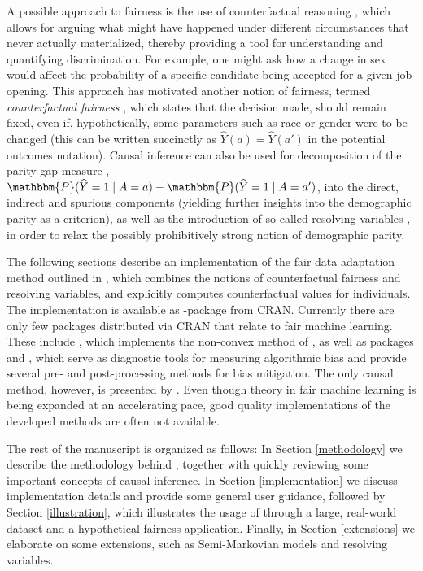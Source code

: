 \documentclass[
  nojss]{jss}
\begin{document}
A possible approach to fairness is the use of counterfactual reasoning
\citep{galles1998axiomatic}, which allows for arguing what might have
happened under different circumstances that never actually materialized,
thereby providing a tool for understanding and quantifying
discrimination. For example, one might ask how a change in sex would
affect the probability of a specific candidate being accepted for a
given job opening. This approach has motivated another notion of
fairness, termed \emph{counterfactual fairness}
\citep{kusner2017counterfactual}, which states that the decision made,
should remain fixed, even if, hypothetically, some parameters such as
race or gender were to be changed (this can be written succinctly as
\(\widehat{Y}(a) = \widehat{Y}(a')\) in the potential outcomes
notation). Causal inference can also be used for decomposition of the
parity gap measure \citep{zhang2018fairness},
\(\mathbbm{P}(\widehat{Y} = 1 \mid A = a) - \mathbbm{P}(\widehat{Y} = 1 \mid A = a')\),
into the direct, indirect and spurious components (yielding further
insights into the demographic parity as a criterion), as well as the
introduction of so-called resolving variables
\cite{kilbertus2017avoiding}, in order to relax the possibly
prohibitively strong notion of demographic parity.

The following sections describe an implementation of the fair data
adaptation method outlined in \cite{plecko2020fair}, which combines the
notions of counterfactual fairness and resolving variables, and
explicitly computes counterfactual values for individuals. The
implementation is available as -package  from
CRAN. Currently there are only few packages distributed via CRAN that
relate to fair machine learning. These include 
\citep{scutari2021fairml}, which implements the non-convex method of
\cite{komiyama2018nonconvex}, as well as packages 
\citep{kozodoi2021fairness} and 
\citep{wisniewski2021fairmodels}, which serve as diagnostic tools for
measuring algorithmic bias and provide several pre- and post-processing
methods for bias mitigation. The only causal method, however, is
presented by . Even though theory in fair machine
learning is being expanded at an accelerating pace, good quality
implementations of the developed methods are often not available.

The rest of the manuscript is organized as follows: In Section
\ref{methodology} we describe the methodology behind ,
together with quickly reviewing some important concepts of causal
inference. In Section \ref{implementation} we discuss implementation
details and provide some general user guidance, followed by Section
\ref{illustration}, which illustrates the usage of 
through a large, real-world dataset and a hypothetical fairness
application. Finally, in Section \ref{extensions} we elaborate on some
extensions, such as Semi-Markovian models and resolving variables.
\end{document}

